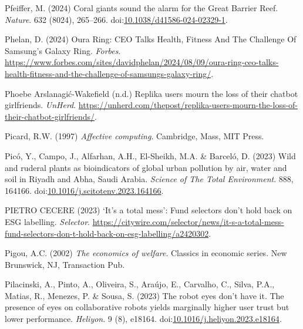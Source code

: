 \documentclass[
  letterpaper,
  DIV=11,
  numbers=noendperiod]{scrartcl}
\newlength{\cslhangindent}
\newenvironment{CSLReferences}[2] %
 {\begin{list}{}{%
  \setlength{\itemindent}{0pt}
  \setlength{\leftmargin}{0pt}
  \setlength{\parsep}{0pt}
  \ifodd #1
   \setlength{\leftmargin}{\cslhangindent}
   \setlength{\itemindent}{-1\cslhangindent}
  \fi
  \setlength{\itemsep}{#2\baselineskip}}}
 {\end{list}}
\begin{document}
\begin{CSLReferences}{0}{1}
Pfeiffer, M. (2024) Coral giants sound the alarm for the {Great Barrier
Reef}. \emph{Nature}. 632 (8024), 265--266.
doi:\href{https://doi.org/10.1038/d41586-024-02329-1}{10.1038/d41586-024-02329-1}.

Phelan, D. (2024) Oura {Ring}: {CEO Talks Health}, {Fitness And The
Challenge Of Samsung}'s {Galaxy Ring}. \emph{Forbes}.
\url{https://www.forbes.com/sites/davidphelan/2024/08/09/oura-ring-ceo-talks-health-fitness-and-the-challenge-of-samsungs-galaxy-ring/}.

Phoebe Arslanagić-Wakefield (n.d.) Replika users mourn the loss of their
chatbot girlfriends. \emph{UnHerd}.
\url{https://unherd.com/thepost/replika-users-mourn-the-loss-of-their-chatbot-girlfriends/}.

Picard, R.W. (1997) \emph{Affective computing}. Cambridge, Mass, MIT
Press.

Picó, Y., Campo, J., Alfarhan, A.H., El-Sheikh, M.A. \& Barceló, D.
(2023) Wild and ruderal plants as bioindicators of global urban
pollution by air, water and soil in {Riyadh} and {Abha}, {Saudi Arabia}.
\emph{Science of The Total Environment}. 888, 164166.
doi:\href{https://doi.org/10.1016/j.scitotenv.2023.164166}{10.1016/j.scitotenv.2023.164166}.

PIETRO CECERE (2023) {`{It}'s a total mess'}: {Fund} selectors don't
hold back on {ESG} labelling. \emph{Selector}.
\url{https://citywire.com/selector/news/it-s-a-total-mess-fund-selectors-don-t-hold-back-on-esg-labelling/a2420302}.

Pigou, A.C. (2002) \emph{The economics of welfare}. Classics in economic
series. New Brunswick, NJ, Transaction Pub.

Pilacinski, A., Pinto, A., Oliveira, S., Araújo, E., Carvalho, C.,
Silva, P.A., Matias, R., Menezes, P. \& Sousa, S. (2023) The robot eyes
don't have it. {The} presence of eyes on collaborative robots yields
marginally higher user trust but lower performance. \emph{Heliyon}. 9
(8), e18164.
doi:\href{https://doi.org/10.1016/j.heliyon.2023.e18164}{10.1016/j.heliyon.2023.e18164}.


\end{CSLReferences}
\end{document}
